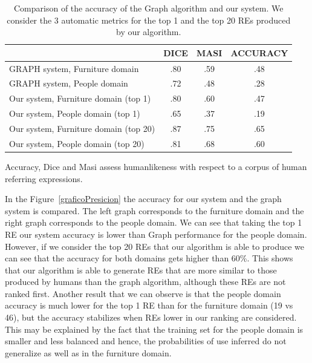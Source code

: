 \begin{table}[h!]
\begin{center}
\begin{tabular}{|l|c|c|c|}
\hline
	 	& 	DICE		&	MASI	&	ACCURACY		\\
\hline
GRAPH system, Furniture domain	& 	.80 		&	.59	&	.48		 	\\
GRAPH system, People domain 	& 	.72		&	.48	&	.28			\\
\hline
Our system, Furniture domain (top 1)	&	.80		&	.60	&	.47		\\
Our system, People domain (top 1)	&	.65		&	.37	&	.19		\\
\hline
Our system, Furniture domain (top 20)&	.87		&	.75  	&	.65		\\
Our system, People domain (top 20)   &	.81		&	.68	&	.60		\\
\hline
\end{tabular}
\caption{Comparison of the accuracy of the Graph algorithm and our system. We consider the 3 automatic metrics for the top 1 and the top 20 REs produced by our algorithm.}
\label{Tabla_sis_1_20}
\end{center}
\end{table}


Accuracy, Dice and Masi assess humanlikeness with respect to a corpus of human referring expressions.

In the Figure~\ref{graficoPresicion} the accuracy for our system and the graph system is compared. The left graph corresponds to the furniture domain and the right graph corresponds to the people domain. We can see that taking the top 1 RE our system accuracy is lower than Graph performance for the people domain. However, if we consider the top 20 REs that our algorithm is able to produce we can see that the accuracy for both domains gets higher than 60\%. This shows that our algorithm is able to generate REs that are more similar to those produced by humans than the graph algorithm, although these REs are not ranked first. Another result that we can observe is that the people domain accuracy is much lower for the top 1 RE than for the furniture domain (19 vs 46), but the accuracy stabilizes when REs lower in our ranking are considered. This may be explained by the fact that the training set for the people domain is smaller and less balanced and hence, the probabilities of use inferred do not generalize as well as in the furniture domain. 

